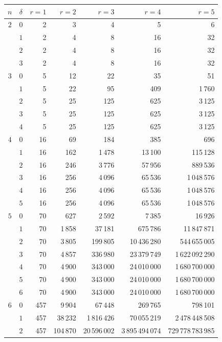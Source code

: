 \documentclass[11pt, a4paper, abstract=yes]{scrartcl}
\theoremstyle{definition}
\theoremstyle{remark}
\theoremstyle{plain}
\begin{document}
\begingroup\footnotesize
\begin{center}
\begin{tabular}{@{}ccrrrrr@{}}
\toprule
\(n\) & \(\delta\) & \(r=1\) & \(r=2\) & \(r=3\) & \(r=4\) & \(r=5\)\\
\midrule
\(2\) & \(0\) & 2 & 3 & 4 & 5 & 6\\
 & \(1\) & 2 & 4 & 8 & 16 & 32\\
 & \(2\) & 2 & 4 & 8 & 16 & 32\\
 & \(3\) & 2 & 4 & 8 & 16 & 32\\
\addlinespace
\(3\) & \(0\) & 5 & 12 & 22 & 35 & 51\\
 & \(1\) & 5 & 22 & 95 & 409 & 1\,760\\
 & \(2\) & 5 & 25 & 125 & 625 & 3\,125\\
 & \(3\) & 5 & 25 & 125 & 625 & 3\,125\\
 & \(4\) & 5 & 25 & 125 & 625 & 3\,125\\
\addlinespace
\(4\) & \(0\) & 16 & 69 & 184 & 385 & 696\\
 & \(1\) & 16 & 162 & 1\,478 & 13\,100 & 115\,128\\
 & \(2\) & 16 & 246 & 3\,776 & 57\,956 & 889\,536\\
 & \(3\) & 16 & 256 & 4\,096 & 65\,536 & 1\,048\,576\\
 & \(4\) & 16 & 256 & 4\,096 & 65\,536 & 1\,048\,576\\
 & \(5\) & 16 & 256 & 4\,096 & 65\,536 & 1\,048\,576\\
\addlinespace
\(5\) & \(0\) & 70 & 627 & 2\,592 & 7\,385 & 16\,926\\
 & \(1\) & 70 & 1\,858 & 37\,181 & 675\,786 & 11\,847\,871\\
 & \(2\) & 70 & 3\,805 & 199\,805 & 10\,436\,280 & 544\,655\,005\\
 & \(3\) & 70 & 4\,857 & 336\,980 & 23\,379\,749 & 1\,622\,092\,290\\
 & \(4\) & 70 & 4\,900 & 343\,000 & 24\,010\,000 & 1\,680\,700\,000\\
 & \(5\) & 70 & 4\,900 & 343\,000 & 24\,010\,000 & 1\,680\,700\,000\\
 & \(6\) & 70 & 4\,900 & 343\,000 & 24\,010\,000 & 1\,680\,700\,000\\
\addlinespace
\(6\) & \(0\) & 457 & 9\,904 & 67\,448 & 269\,765 & 798\,101\\
 & \(1\) & 457 & 38\,232 & 1\,816\,426 & 70\,055\,219 & 2\,478\,448\,508\\
 & \(2\) & 457 & 104\,870 & 20\,596\,002 & 3\,895\,494\,074 & 729\,778\,783\,985\\

\end{tabular}
\end{center}
\end{document}
